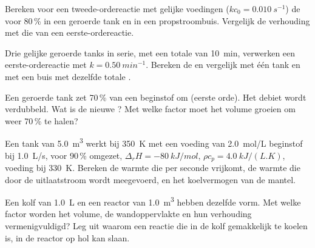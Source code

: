 \begin{exercise}[$\star\star$]\label{exo:b2:continuous-reactors:5}
Bereken voor een tweede-ordereactie met gelijke voedingen ($kc_0 = \qty{0.010}{s^{-1}}$)
de  voor 80\,\%  in een geroerde tank en in een
propstroombuis. Vergelijk de verhouding met die van een eerste-ordereactie.
\end{exercise}

\begin{exercise}[$\star\star$]\label{exo:b2:continuous-reactors:6}
Drie gelijke geroerde tanks in serie, met een totale  van \qty{10}{min},
verwerken een eerste-ordereactie met $k = \qty{0.50}{min^{-1}}$. Bereken de
 en vergelijk met één tank en met een buis met dezelfde totale
.
\end{exercise}

\begin{exercise}[$\star\star$]\label{exo:b2:continuous-reactors:7}
Een geroerde tank zet 70\,\% van een beginstof om (eerste orde). Het debiet wordt
verdubbeld. Wat is de nieuwe ? Met welke factor moet het volume groeien om
weer 70\,\% te halen?
\end{exercise}

\begin{exercise}[$\star\star$]\label{exo:b2:continuous-reactors:8}
Een tank van \qty{5.0}{m^3} werkt bij \qty{350}{K} met een voeding van
\qty{2.0}{mol/L} beginstof bij \qty{1.0}{L/s}, voor 90\,\% omgezet, $\Delta_r H
= \qty{-80}{kJ/mol}$, $\rho c_p = \qty{4.0}{kJ/(L.K)}$, voeding bij \qty{330}{K}.
Bereken de warmte die per seconde vrijkomt, de warmte die door de uitlaatstroom
wordt meegevoerd, en het koelvermogen van de mantel.
\end{exercise}

\begin{exercise}[$\star\star$]\label{exo:b2:continuous-reactors:9}
Een kolf van \qty{1.0}{L} en een reactor van \qty{1.0}{m^3} hebben dezelfde vorm.
Met welke factor worden het volume, de wandoppervlakte en hun verhouding
vermenigvuldigd? Leg uit waarom een reactie die in de kolf gemakkelijk te koelen is, in de reactor
op hol kan slaan.
\end{exercise}

